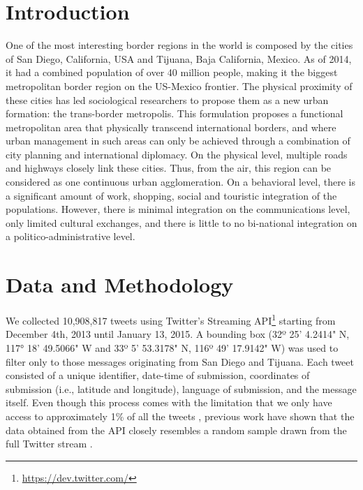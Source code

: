 \documentclass[11pt]{article}
\title{}
\author{}
\date{\today}
\begin{document}
\maketitle

\begin{abstract}

\end{abstract}

\section{Introduction}
One of the most interesting border regions in the world is composed by the cities of San Diego, California, USA and Tijuana, Baja California, Mexico. As of 2014, it had a combined population of over 40 million people, making it the biggest metropolitan border region on the US-Mexico frontier. The physical proximity of these cities has led sociological researchers to propose them as a new urban formation: the trans-border metropolis. This formulation proposes  a functional metropolitan area that physically transcend international borders, and where urban management in such areas can only be achieved through a combination of city planning and international diplomacy.  On the physical level, multiple roads and highways closely link these cities. Thus, from the air, this region can be considered as one continuous urban agglomeration. On a behavioral level, there is a significant amount of work, shopping, social and touristic integration of the populations. However, there is minimal integration on the communications level, only limited cultural exchanges, and there is little to no bi-national integration on a politico-administrative level. 


\section{Data and Methodology}
We collected 10,908,817 tweets using Twitter's Streaming API\footnote{\url{https://dev.twitter.com/}} starting from December 4th, 2013 until January 13, 2015. A bounding box (32º 25' 4.2414" N, 117° 18' 49.5066" W and 33º 5' 53.3178" N, 116º 49' 17.9142" W) was used to filter only to those messages originating from San Diego and Tijuana. Each tweet consisted of a unique identifier, date-time of submission, coordinates of submission (i.e., latitude and longitude), language of submission, and the message itself. Even though this process comes with the limitation that we only have access to approximately 1\% of all the tweets \cite{Olteanu2015}, previous work have shown that the data obtained from the API closely resembles a random sample drawn from the full Twitter stream \cite{DBLP:journals/corr/MorstatterPLC13}.
\end{document}
